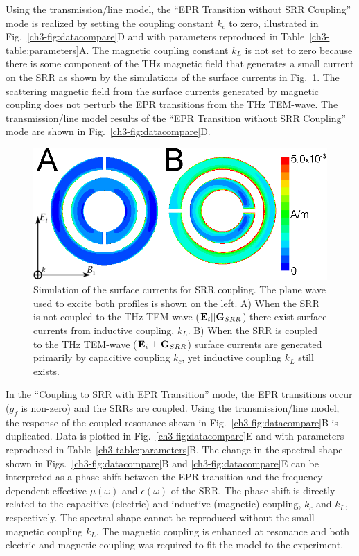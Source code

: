 Using the transmission\-/line model, the ``EPR Transition without SRR Coupling'' mode is realized by setting the coupling constant $k_c$ to zero, illustrated in Fig.~\ref{ch3-fig:datacompare}D and with parameters reproduced in Table~\ref{ch3-table:parameters}A. The magnetic coupling constant $k_L$ is not set to zero because there is some component of the THz magnetic field that generates a small current on the SRR as shown by the simulations of the surface currents in Fig.~\ref{ch3-fig:surfacecurrent}. The scattering magnetic field from the surface currents generated by magnetic coupling does not perturb the EPR transitions from the THz TEM-wave. The transmission\-/line model results of the ``EPR Transition without SRR Coupling'' mode are shown in Fig.~\ref{ch3-fig:datacompare}D.

\begin{figure}[htbp]\centering
  \includegraphics{Kapitel/Ch3-Images/SurfaceCurrent-THz.eps}%
  \caption[Simulation of the surface currents for SRR coupling.]{Simulation of the surface currents for SRR coupling. The plane wave used to excite both profiles is shown on the left. A) When the SRR is not coupled to the THz TEM-wave ($\textbf{E}_{i}||\textbf{G}_{SRR}$) there exist surface currents from inductive coupling, $k_L$. B) When the SRR is coupled to the THz TEM-wave ($\textbf{E}_{i}\perp\textbf{G}_{SRR}$) surface currents are generated primarily by capacitive coupling $k_c$, yet inductive coupling $k_L$ still exists.} \label{ch3-fig:surfacecurrent}
\end{figure}


In the ``Coupling to SRR with EPR Transition'' mode, the EPR transitions occur ($g_f$ is non-zero) and the SRRs are coupled. Using the transmission\-/line model, the response of the coupled resonance shown in Fig.~\ref{ch3-fig:datacompare}B is duplicated. Data is plotted in Fig.~\ref{ch3-fig:datacompare}E and with parameters reproduced in Table~\ref{ch3-table:parameters}B. The change in the spectral shape shown in Figs.~\ref{ch3-fig:datacompare}B and \ref{ch3-fig:datacompare}E can be interpreted as a phase shift between the EPR transition and the frequency-dependent effective $\mu(\omega)$ and $\epsilon(\omega)$ of the SRR. The phase shift is directly related to the capacitive (electric) and inductive (magnetic) coupling, $k_c$ and $k_L$, respectively. The spectral shape cannot be reproduced without the small magnetic coupling $k_L$. The magnetic coupling is enhanced at resonance and both electric and magnetic coupling was required to fit the model to the experiment.

